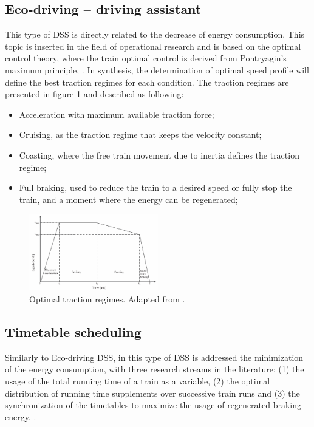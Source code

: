 \subsection{Eco-driving – driving assistant}
\label{subs:352}

	This type of \ac{DSS} is directly related to the decrease of energy consumption. This topic is inserted in the field of operational research and is based on the optimal control theory, where the train optimal control is derived from Pontryagin's maximum principle, \cite{pontryagin1963}.  
	In synthesis, the determination of optimal speed profile will define the best traction regimes for each condition. The traction regimes are presented in figure \ref{fig:scheepmaker2017a} and described as following:
	
	\begin{itemize}
		\setlength\itemsep{-0.5em}
		\item Acceleration with maximum available traction force;
		\item Cruising, as the traction regime that keeps the velocity constant;
		\item Coasting, where the free train movement due to inertia defines the traction regime;
		\item Full braking, used to reduce the train to a desired speed or fully stop the train, and a moment where the energy can be regenerated;
	\end{itemize}
	
	\begin{figure}[h!]
		\centering
		\includegraphics[width=0.5\textwidth,keepaspectratio]{figures/35.DSS/scheepmaker2017a}
		\caption{Optimal traction regimes. Adapted from \cite{scheepmaker2017}.}
		\label{fig:scheepmaker2017a}
	\end{figure}
	
	

\subsection{Timetable scheduling}
\label{subs:353}

	Similarly to Eco-driving \ac{DSS}, in this type of \ac{DSS} is addressed the minimization of the energy consumption, with three research streams in the literature: (1) the usage of the total running time of a train as a variable, (2) the optimal distribution of running time supplements over successive train runs and (3) the synchronization of the timetables to maximize the usage of regenerated braking energy, \cite{scheepmaker2017}.
	
	
	
